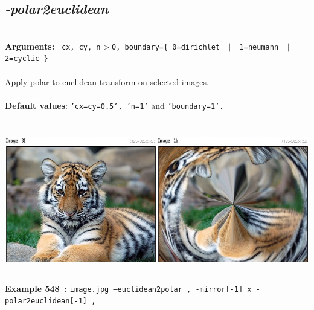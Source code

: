 \documentclass[a4paper,11pt,twoside]{book}
\begin{document}
\subsection{\emph{-polar2euclidean} }\vspace*{-0.5em}
~\\\textbf{Arguments: } 
{\small \texttt{\_cx,\_cy,\_n$>$0,\_boundary=\{ 0=dirichlet ~$|$~ 1=neumann ~$|$~ 2=cyclic \}}}\\~\\
Apply polar to euclidean transform on selected images.
~\\~\\\textbf{Default values}: {\small \texttt{'cx=cy=0.5', 'n=1'} and \texttt{'boundary=1'.}}
\begin{center}\includegraphics[keepaspectratio=true,height=7cm,width=\textwidth]{img/gmic_def548.jpg}\\
{\footnotesize \textbf{Example 548~:} \texttt{image.jpg --euclidean2polar , -mirror[-1] x -polar2euclidean[-1] ,}}
\end{center}
\end{document}
